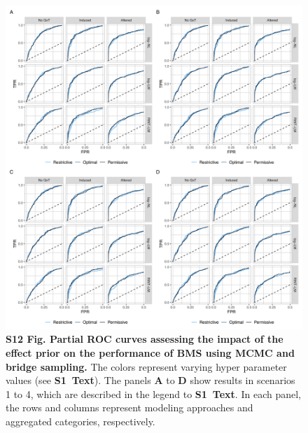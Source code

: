 \documentclass[11pt]{article}
\newcommand{\stext}{\textbf{S1~Text}\xspace}
\begin{document}
\begin{figure}[!ht]
\begin{center}
  \includegraphics[width=1\textwidth]{png/sim_procc_effect_mcmc_bs.png}
\end{center}  
\caption{
  {\bf
    S12 Fig.
    Partial ROC curves assessing the impact of the effect prior on the performance of BMS using MCMC and bridge sampling.}
The colors represent varying hyper parameter values (see
\stext). The panels \textbf{A} to \textbf{D} show results in scenarios 1 to 4, which are described in the legend to \stext. In each panel, the rows and columns represent modeling approaches and aggregated categories, respectively.
}    
\label{s-fig:sim-procc-effect-mcmc}
\end{figure}
\end{document}
